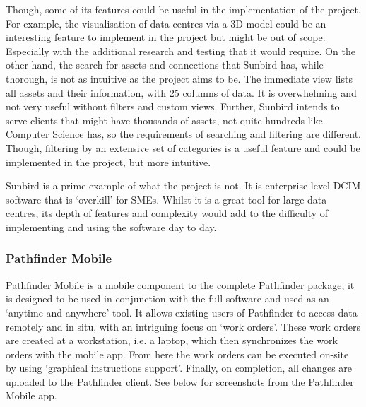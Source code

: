 \documentclass [11pt,a4paper]{article}
\begin{document}
Though, some of its features could be useful in the implementation of the project. For example, the visualisation of data centres via a 3D model could be an interesting feature to implement in the project but might be out of scope. Especially with the additional research and testing that it would require. On the other hand, the search for assets and connections that Sunbird has, while thorough, is not as intuitive as the project aims to be. The immediate view lists all assets and their information, with 25 columns of data. It is overwhelming and not very useful without filters and custom views. Further, Sunbird intends to serve clients that might have thousands of assets, not quite hundreds like Computer Science has, so the requirements of searching and filtering are different. Though, filtering by an extensive set of categories is a useful feature and could be implemented in the project, but more intuitive. 

Sunbird is a prime example of what the project is not. It is enterprise-level DCIM software that is `overkill' for SMEs. Whilst it is a great tool for large data centres, its depth of features and complexity would add to the difficulty of implementing and using the software day to day.

\subsubsection{Pathfinder Mobile}
\label{sec:pathfinder}

Pathfinder Mobile is a mobile component to the complete Pathfinder package, it is designed to be used in conjunction with the full software and used as an `anytime and anywhere' \cite{PathfinderMobile} tool. It allows existing users of Pathfinder to access data remotely and in situ, with an intriguing focus on `work orders'. These work orders are created at a workstation, i.e. a laptop, which then synchronizes the work orders with the mobile app. From here the work orders can be executed on-site by using `graphical instructions support'\cite{Pathfinder}. Finally, on completion, all changes are uploaded to the Pathfinder client. See below for screenshots from the Pathfinder Mobile app. 
\end{document}
